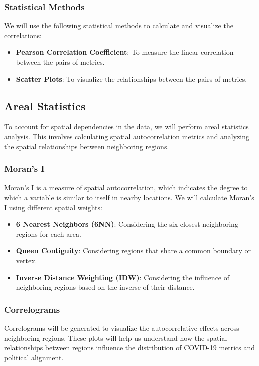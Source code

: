 \documentclass[10pt,journal,compsoc]{IEEEtran}
\begin{document}
\subsubsection{Statistical Methods}
We will use the following statistical methods to calculate and visualize the correlations:
\begin{itemize}
    \item \textbf{Pearson Correlation Coefficient}: To measure the linear correlation between the pairs of metrics.
    \item \textbf{Scatter Plots}: To visualize the relationships between the pairs of metrics.
\end{itemize}

\subsection{Areal Statistics}

To account for spatial dependencies in the data, we will perform areal statistics analysis. This involves calculating spatial autocorrelation metrics and analyzing the spatial relationships between neighboring regions.

\subsubsection{Moran's I}
Moran's I is a measure of spatial autocorrelation, which indicates the degree to which a variable is similar to itself in nearby locations. We will calculate Moran's I using different spatial weights:
\begin{itemize}
    \item \textbf{6 Nearest Neighbors (6NN)}: Considering the six closest neighboring regions for each area.
    \item \textbf{Queen Contiguity}: Considering regions that share a common boundary or vertex.
    \item \textbf{Inverse Distance Weighting (IDW)}: Considering the influence of neighboring regions based on the inverse of their distance.
\end{itemize}

\subsubsection{Correlograms}
Correlograms will be generated to visualize the autocorrelative effects across neighboring regions. These plots will help us understand how the spatial relationships between regions influence the distribution of COVID-19 metrics and political alignment.
\end{document}
